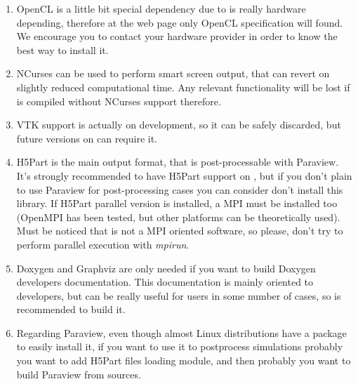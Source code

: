 \begin{enumerate}
	\item OpenCL is a little bit special dependency due to is really hardware
	depending, therefore at the web page only OpenCL specification will found.
	We encourage you to contact your hardware provider in order to know the
	best way to install it.
	\item NCurses can be used to perform smart screen output, that can revert
	on slightly reduced computational time. Any relevant functionality will
	be lost if \NAME is compiled without NCurses support therefore.
	\item VTK support is actually on development, so it can be safely discarded,
	but future versions on \NAME can require it.
	\item H5Part is the main \NAME output format, that is post-processable with
	Paraview. It's strongly recommended to have H5Part support on \NAME, but if
	you don't plain to use Paraview for post-processing cases you can consider
	don't install this library. If H5Part parallel version is installed, a MPI
	must be installed too (OpenMPI has been tested, but other platforms can be
	theoretically used). Must be noticed that \NAME is not a MPI oriented
	software, so please, don't try to perform parallel execution with
	\textit{mpirun}.
	\item Doxygen and Graphviz are only needed if you want to build Doxygen
	developers documentation. This documentation is mainly oriented to developers,
	but can be really useful for users in some number of cases, so is recommended
	to build it.
	\item Regarding Paraview, even though almost Linux distributions have a
	package to easily install it, if you want to use it to postprocess \NAME
	simulations probably you want to add H5Part files loading module, and then
	probably you want to build Paraview from sources.
\end{enumerate}
%
